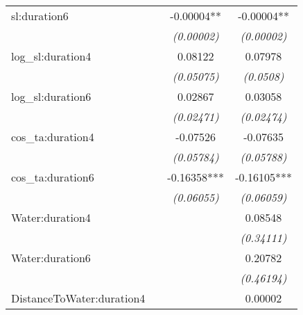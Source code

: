 \begin{tabular}[t]{lccc}
sl:duration6 &  & -0.00004** & -0.00004**\\
\begingroup\fontsize{8}{10}\selectfont \em{}\endgroup & \begingroup\fontsize{8}{10}\selectfont \em{}\endgroup & \begingroup\fontsize{8}{10}\selectfont \em{(0.00002)}\endgroup & \begingroup\fontsize{8}{10}\selectfont \em{(0.00002)}\endgroup\\
log\_sl:duration4 &  & 0.08122 & 0.07978\\
\begingroup\fontsize{8}{10}\selectfont \em{}\endgroup & \begingroup\fontsize{8}{10}\selectfont \em{}\endgroup & \begingroup\fontsize{8}{10}\selectfont \em{(0.05075)}\endgroup & \begingroup\fontsize{8}{10}\selectfont \em{(0.0508)}\endgroup\\
log\_sl:duration6 &  & 0.02867 & 0.03058\\
\begingroup\fontsize{8}{10}\selectfont \em{}\endgroup & \begingroup\fontsize{8}{10}\selectfont \em{}\endgroup & \begingroup\fontsize{8}{10}\selectfont \em{(0.02471)}\endgroup & \begingroup\fontsize{8}{10}\selectfont \em{(0.02474)}\endgroup\\
cos\_ta:duration4 &  & -0.07526 & -0.07635\\
\begingroup\fontsize{8}{10}\selectfont \em{}\endgroup & \begingroup\fontsize{8}{10}\selectfont \em{}\endgroup & \begingroup\fontsize{8}{10}\selectfont \em{(0.05784)}\endgroup & \begingroup\fontsize{8}{10}\selectfont \em{(0.05788)}\endgroup\\
cos\_ta:duration6 &  & -0.16358*** & -0.16105***\\
\begingroup\fontsize{8}{10}\selectfont \em{}\endgroup & \begingroup\fontsize{8}{10}\selectfont \em{}\endgroup & \begingroup\fontsize{8}{10}\selectfont \em{(0.06055)}\endgroup & \begingroup\fontsize{8}{10}\selectfont \em{(0.06059)}\endgroup\\
Water:duration4 &  &  & 0.08548\\
\begingroup\fontsize{8}{10}\selectfont \em{}\endgroup & \begingroup\fontsize{8}{10}\selectfont \em{}\endgroup & \begingroup\fontsize{8}{10}\selectfont \em{}\endgroup & \begingroup\fontsize{8}{10}\selectfont \em{(0.34111)}\endgroup\\
Water:duration6 &  &  & 0.20782\\
\begingroup\fontsize{8}{10}\selectfont \em{}\endgroup & \begingroup\fontsize{8}{10}\selectfont \em{}\endgroup & \begingroup\fontsize{8}{10}\selectfont \em{}\endgroup & \begingroup\fontsize{8}{10}\selectfont \em{(0.46194)}\endgroup\\
DistanceToWater:duration4 &  &  & 0.00002\\

\end{tabular}
